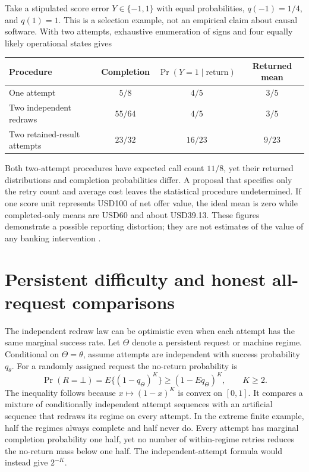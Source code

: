 Take a stipulated score error $Y\in\{-1,1\}$ with equal probabilities,
$q(-1)=1/4$, and $q(1)=1$. This is a selection example, not an empirical
claim about causal software. With two attempts, exhaustive enumeration of
signs and four equally likely operational states gives
\begin{center}
\begin{tabular}{lccc}
\hline
Procedure & Completion & $\Pr(Y=1\mid\text{return})$ & Returned mean\\
\hline
One attempt & $5/8$ & $4/5$ & $3/5$\\
Two independent redraws & $55/64$ & $4/5$ & $3/5$\\
Two retained-result attempts & $23/32$ & $16/23$ & $9/23$\\
\hline
\end{tabular}
\end{center}
Both two-attempt procedures have expected call count $11/8$, yet their
returned distributions and completion probabilities differ. A proposal that
specifies only the retry count and average cost leaves the statistical
procedure undetermined. If one score unit represents USD100 of net offer
value, the ideal mean is zero while completed-only means are USD60 and about
USD39.13. These figures demonstrate a possible reporting distortion; they are
not estimates of the value of any banking intervention
\citep{exec17_s9_composition}.

\section{Persistent difficulty and honest all-request comparisons}
\label{exec17:s9-persistent-failures}

The independent redraw law can be optimistic even when each attempt has the
same marginal success rate. Let $\Theta$ denote a persistent request or
machine regime. Conditional on $\Theta=\theta$, assume attempts are
independent with success probability $q_\theta$. For a randomly assigned
request the no-return probability is
\begin{equation}
 \Pr(R=\bot)=E\{(1-q_\Theta)^K\}
 \geq (1-Eq_\Theta)^K,\qquad K\geq2.
 \label{exec17:s9-persistent-retry}
\end{equation}
The inequality follows because $x\mapsto(1-x)^K$ is convex on $[0,1]$.
It compares a mixture of conditionally independent attempt sequences with
an artificial sequence that redraws its regime on every attempt. In the
extreme finite example, half the regimes always complete and half never do.
Every attempt has marginal completion probability one half, yet no number
of within-regime retries reduces the no-return mass below one half. The
independent-attempt formula would instead give $2^{-K}$.

